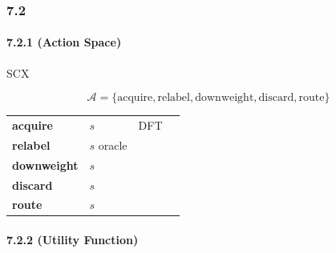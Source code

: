 \documentclass[
  12pt,
]{article}
\begin{document}
\subsubsection{7.2 }\label{ux6570ux5b66ux6a21ux578b-6}

\paragraph{7.2.1  (Action
Space)}\label{ux52a8ux4f5cux7a7aux95f4-action-space}

SCX 

\[
\mathcal{A} = \{ \text{acquire}, \text{relabel}, \text{downweight}, \text{discard}, \text{route} \}
\]

\begin{longtable}[]{@{}
  >{\raggedright\arraybackslash}p{}
  >{\raggedright\arraybackslash}p{}
  >{\raggedright\arraybackslash}p{}
  >{\raggedright\arraybackslash}p{}@{}}
\toprule\noalign{}
\begin{minipage}[b]{\linewidth}\raggedright

\end{minipage} & \begin{minipage}[b]{\linewidth}\raggedright

\end{minipage} & \begin{minipage}[b]{\linewidth}\raggedright

\end{minipage} & \begin{minipage}[b]{\linewidth}\raggedright

\end{minipage} \\
\midrule\noalign{}
\endhead
\bottomrule\noalign{}
\endlastfoot
\textbf{acquire} &  \(s\)  &  DFT  &
 \\
\textbf{relabel} &  \(s\)  oracle &
 &  \\
\textbf{downweight} &  \(s\)  &
 &  \\
\textbf{discard} &  \(s\)  &  &
 \\
\textbf{route} &  \(s\)  &
 &  \\
\end{longtable}

\paragraph{7.2.2  (Utility
Function)}\label{ux6548ux7528ux51fdux6570-utility-function}
\end{document}
